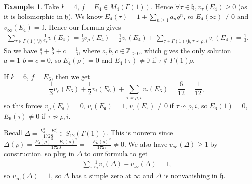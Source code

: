 \documentclass{article}
\theoremstyle{definition}
\newtheorem{example}{Example}[section]
\begin{document}

\begin{example}
    Take $k=4$, $f = E_4 \in M_{4}(\Gamma(1))$. Hence $\forall \tau \in \mathfrak{h}, v_{\tau}(E_4)\ge 0$ (as it is holomorphic in $\mathfrak{h}$). We know $E_4(\tau) = 1 + \sum_{n\ge 1}^{} a_nq^n$, so $E_4(\infty) \neq 0$ and $v_{\infty}(E_4) = 0$. Hence our formula gives 
    \begin{align*}
        \sum_{\tau \in \Gamma(1)\setminus \mathfrak{h}}^{} \frac{1}{e_{\tau}}v_{}(E_4) = \frac{1}{3} v_{\rho}(E_4) + \frac{1}{2}v_i(E_4) + \sum_{\tau \in \Gamma(1)\setminus \mathfrak{h}, \tau \not\sim \rho,i}^{} v_{\tau}(E_4) = \frac{1}{3}.
    \end{align*}
    So we have $\frac{a}{3}+\frac{b}{2}+c = \frac{1}{3}$, where $a,b,c \in \mathbb{Z}_{\ge 0}$, which gives the only solution $a=1, b=c=0$, so $E_4(\rho)=0$ and $E_4(\tau) \neq 0$ if $\tau \not\in \Gamma(1)\rho$.
    \vspace{1mm}
     
    If $k=6$, $f = E_6$, then we get \[
    \frac{1}{3}v_{\rho}(E_6) + \frac{1}{2}v_i(E_6) + \sum_{\tau \not\sim \rho,i}^{} v_{\tau}(E_6) = \frac{6}{12} = \frac{1}{12},
    \]
    so this forces $v_{\rho}(E_6) = 0$, $v_{i}(E_6) = 1$, $v_{\tau}(E_6) \neq 0$ if $\tau \not\sim \rho, i$, so $E_6(1) = 0$, $E_6(\tau) \neq 0$ if $\tau \not\sim \rho,i$.
\end{example}
Recall $\Delta = \frac{E_4^3 - E_6^2}{1728} \in S_{12}(\Gamma(1))$. This is nonzero since $\Delta(\rho) = \frac{E_4(\rho)^3 - E_6(\rho)^2}{1728}  = -\frac{E_6(\rho)^2}{1728} \neq 0$. We also have $v_{\infty}(\Delta)\ge 1$ by construction, so plug in $\Delta$ to our formula to get 
\begin{align*}
    \sum_{\tau}^{} \frac{1}{e_{\tau}}v_{\tau}(\Delta) + v_{\infty}(\Delta) = 1,
\end{align*}
so $v_{\infty}(\Delta) = 1$, so $\Delta$ has a simple zero at $\infty$ and $\Delta$ is nonvanishing in $\mathfrak{h}$.
\end{document}
